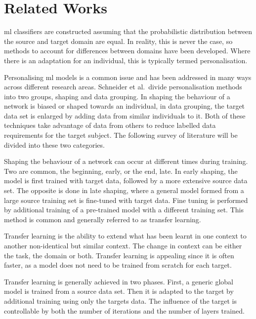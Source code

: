 \section{Related Works} %
\label{sec:personalisation-related-works}
\acrshort{ml} classifiers are constructed assuming that the probabilistic distribution between the source and target domain are equal\cite{Farahani2020}. In reality, this is never the case, so methods to account for differences between domains have been developed. Where there is an adaptation for an individual, this is typically termed personalisation.

Personalising \acrshort{ml} models is a common issue and has been addressed in many ways across different research areas\cite{Mairittha2021, Tomanek2021}. Schneider et al.~divide personalisation methods into two groups, shaping and data grouping\cite{Schneider2021}. In shaping the behaviour of a network is biased or shaped towards an individual, in data grouping, the target data set is enlarged by adding data from similar individuals to it. Both of these techniques take advantage of data from others to reduce labelled data requirements for the target subject\cite{Shor2020}. The following survey of literature will be divided into these two categories. 

Shaping the behaviour of a network can occur at different times during training. Two are common, the beginning, early, or the end, late. In early shaping, the model is first trained with target data, followed by a more extensive source data set. The opposite is done in late shaping, where a general model formed from a large source training set is fine-tuned with target data. Fine tuning is performed by additional training of a pre-trained model with a different training set. This method is common and generally referred to as transfer learning.\cite{Schneider2021}

Transfer learning is the ability to extend what has been learnt in one context to another non-identical but similar context\cite{Fallahzadeh2017}. The change in context can be either the task, the domain or both. Transfer learning is appealing since it is often faster, as a model does not need to be trained from scratch for each target. 

Transfer learning is generally achieved in two phases. First, a generic global model is trained from a source data set. Then it is adapted to the target by additional training using only the targets data. The influence of the target is controllable by both the number of iterations and the number of layers trained.\cite{Schneider2021, Mireshghallah2021}


